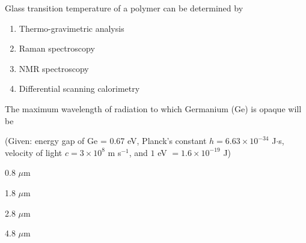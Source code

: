 \bigskip

\item Glass transition temperature of a polymer can be determined by

\begin{enumerate}
    \item Thermo-gravimetric analysis
    \item Raman spectroscopy
    \item NMR spectroscopy
    \item Differential scanning calorimetry
\end{enumerate}
\bigskip

\item The maximum wavelength of radiation to which Germanium (Ge) is opaque will be

(Given: energy gap of Ge = 0.67 eV, Planck's constant $h = 6.63 \times 10^{-34}$ J$\cdot$s, velocity of light $c = 3 \times 10^8$ m s$^{-1}$, and $1$ eV $= 1.6 \times 10^{-19}$ J)

\begin{enumerate}
\begin{multicols}{4}
    \item 0.8 $\mu$m
    \item 1.8 $\mu$m
    \item 2.8 $\mu$m
    \item 4.8 $\mu$m
    \end{multicols}
\end{enumerate}


